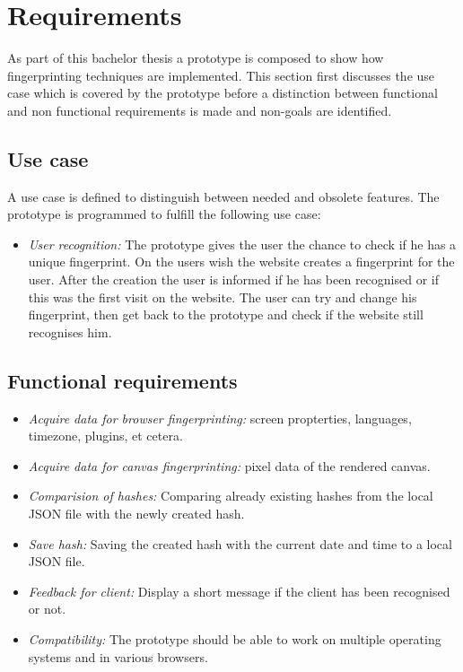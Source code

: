 \chapter{Requirements}
\label{cha:requirements}
As part of this bachelor thesis a prototype is composed  to show how fingerprinting techniques are implemented. This section first discusses the use case which is covered by the prototype before a distinction between functional and non functional requirements is made and non-goals are identified.

\section{Use case}
A use case is defined to distinguish between needed and obsolete features. The prototype is programmed to fulfill the following use case:

\begin{itemize}
	\item \textit{User recognition: } The prototype gives the user the chance to check if he has a unique fingerprint. On the users wish the website creates a fingerprint for the user. After the creation the user is informed if he has been recognised or if this was the first visit on the website. The user can try and change his fingerprint, then get back to the prototype and check if the website still recognises him.
\end{itemize}

\section{Functional requirements}

\begin{itemize}
\item \textit{Acquire data for browser fingerprinting: }
screen propterties, languages, timezone, plugins, et cetera.
\item \textit{Acquire data for canvas fingerprinting: }
pixel data of the rendered canvas.
\item \textit{Comparision of hashes: }Comparing already existing hashes from the local JSON file with the newly created hash.
\item \textit{Save hash: }Saving the created hash with the current date and time to a local JSON file.
\item \textit{Feedback for client: }Display a short message if the client has been recognised or not.
\item \textit{Compatibility: }The prototype should be able to work on multiple operating systems and in various browsers.
\end{itemize}

